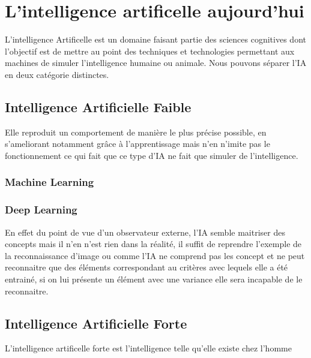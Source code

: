 
\chapter{L'intelligence artificelle aujourd'hui}
L'intelligence Artificelle est un domaine faisant partie 
des sciences cognitives dont l'objectif est de mettre au
point des techniques et technologies permettant aux 
machines de simuler l'intelligence humaine ou animale.
Nous pouvons séparer l'IA en deux catégorie distinctes. 

\section{Intelligence Artificielle Faible}
Elle reproduit un comportement de manière le plus précise possible,
en s'ameliorant notamment grâce à l'apprentissage 
mais n'en n'imite pas le fonctionnement ce qui fait que
ce type d'IA ne fait que simuler de l'intelligence. \newline

\subsection{Machine Learning}


\subsection{Deep Learning}


En effet du point de vue d'un observateur externe, l'IA 
semble maitriser des concepts mais il n'en n'est rien dans la 
réalité, il suffit de reprendre l'exemple de la reconnaissance d'image
ou comme l'IA ne comprend pas les concept et ne peut reconnaitre 
que des éléments correspondant au critères avec lequels elle a été 
entrainé, si on lui présente un élément avec une variance elle 
sera incapable de le reconnaitre. 
    
\section{Intelligence Artificielle Forte}
L'intelligence artificelle forte est l'intelligence
telle qu'elle existe chez l'homme


